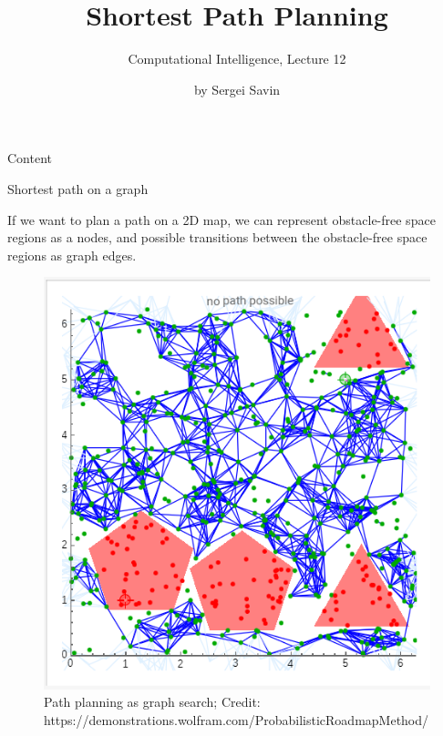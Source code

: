\documentclass{beamer}
\title{Shortest Path Planning}
\subtitle{Computational Intelligence, Lecture 12}
\author{by Sergei Savin}
\date{\mydate}
\begin{document}
\maketitle


\begin{frame}{Content}


\end{frame}



\begin{frame}{Shortest path on a graph}
	\begin{flushleft}
		
		If we want to plan a path on a 2D map, we can represent obstacle-free space regions as a nodes, and possible transitions between the obstacle-free space regions as graph edges. 
		
		\begin{figure}
			\centering
			\includegraphics[width=0.4\linewidth]{GraphPathPlanning}
			\caption{Path planning as graph search; \scriptsize{Credit: https://demonstrations.wolfram.com/ProbabilisticRoadmapMethod/}}
			\label{fig:graphpathplanning}
		\end{figure}
		
		
	\end{flushleft}
\end{frame}
\end{document}
